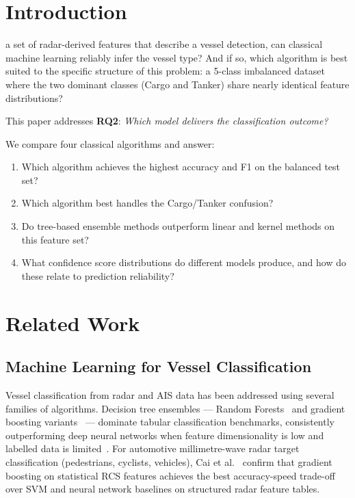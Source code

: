 \documentclass[journal]{IEEEtran}
\begin{document}
\section{Introduction}

 a set of radar-derived features that describe a vessel
detection, can classical machine learning reliably infer the vessel type?
And if so, which algorithm is best suited to the specific structure of this
problem: a 5-class imbalanced dataset where the two dominant classes
(Cargo and Tanker) share nearly identical feature distributions?

This paper addresses \textbf{RQ2}: \textit{Which model delivers the classification outcome?}

We compare four classical algorithms and answer:
\begin{enumerate}
  \item Which algorithm achieves the highest accuracy and F1 on the balanced test set?
  \item Which algorithm best handles the Cargo/Tanker confusion?
  \item Do tree-based ensemble methods outperform linear and kernel methods on
        this feature set?
  \item What confidence score distributions do different models produce, and
        how do these relate to prediction reliability?
\end{enumerate}

\section{Related Work}
\label{sec:relatedwork}

\subsection{Machine Learning for Vessel Classification}

Vessel classification from radar and AIS data has been addressed using several families of algorithms. Decision tree ensembles --- Random Forests~\cite{breiman2001random} and gradient boosting variants~\cite{friedman2001greedy,chen2016xgboost} --- dominate tabular classification benchmarks, consistently outperforming deep neural networks when feature dimensionality is low and labelled data is limited~\cite{grinsztajn2022trees}. For automotive millimetre-wave radar target classification (pedestrians, cyclists, vehicles), Cai et al.~\cite{cai2021mmwave} confirm that gradient boosting on statistical RCS features achieves the best accuracy-speed trade-off over SVM and neural network baselines on structured radar feature tables.
\end{document}
